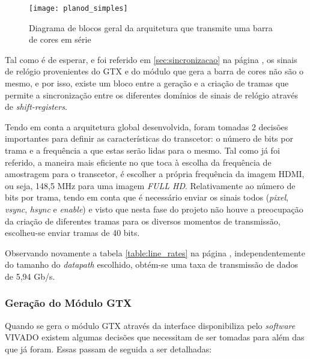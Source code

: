 \begin{figure}[h!]
	\begin{center}
		\leavevmode
		\texttt{[image: planod\_simples]}
		\captionsetup{width=1.0\linewidth}
		\caption[Diagrama de blocos geral da arquitetura que transmite uma barra de cores em série]{Diagrama de blocos geral da arquitetura que transmite uma barra de cores em série}
		\label{fig:planD_SIMPLES}
	\end{center}
\end{figure}

Tal como é de esperar, e foi referido em \ref{sec:sincronizacao} na página \pageref{sec:sincronizacao}, os sinais de relógio provenientes do GTX e do módulo que gera a barra de cores não são o mesmo, e por isso, existe um bloco entre a geração e a criação de tramas que permite a sincronização entre os diferentes domínios de sinais de relógio através de \textit{shift-registers}.

Tendo em conta a arquitetura global desenvolvida, foram tomadas 2 decisões importantes para definir as características do transcetor: o número de bits por trama e a frequência a que estas serão lidas para o mesmo. Tal como já foi referido, a maneira mais eficiente no que toca à escolha da frequência de amostragem para o transcetor, é escolher a própria frequência da imagem HDMI, ou seja, 148,5 MHz para uma imagem \textit{FULL HD}. Relativamente ao número de bits por trama, tendo em conta que é necessário enviar os sinais todos (\textit{pixel}, \textit{vsync}, \textit{hsync} e \textit{enable}) e visto que nesta fase do projeto não houve a preocupação da criação de diferentes tramas para os diversos momentos de transmissão, escolheu-se enviar tramas de 40 bits.

Observando novamente a tabela \ref{table:line_rates} na página \pageref{table:line_rates}, independentemente do tamanho do \textit{datapath} escolhido, obtém-se uma taxa de transmissão de dados de 5,94 Gb/s.

\subsubsection*{Geração do Módulo GTX} \label{subsub:GTX_generate}

Quando se gera o módulo GTX através da interface disponibiliza pelo \textit{software} VIVADO existem algumas decisões que necessitam de ser tomadas para além das que já foram. Essas passam de seguida a ser detalhadas:

